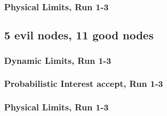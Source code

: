 \documentclass[onecolumn]{IEEEtran}
\begin{document}
\clearpage

\subsubsection{Physical Limits, Run 1-3}

\begin{minipage}[b]{\textwidth}

\end{minipage}

\clearpage
\subsection{\textbf{5 evil nodes}, 11 good nodes}

\subsubsection{Dynamic Limits, Run 1-3}

\begin{minipage}[b]{\textwidth}

\end{minipage}

\clearpage

\subsubsection{Probabilistic Interest accept, Run 1-3}

\begin{minipage}[b]{\textwidth}

\end{minipage}

\clearpage

\subsubsection{Physical Limits, Run 1-3}

\begin{minipage}[b]{\textwidth}

\end{minipage}

\clearpage
\end{document}
